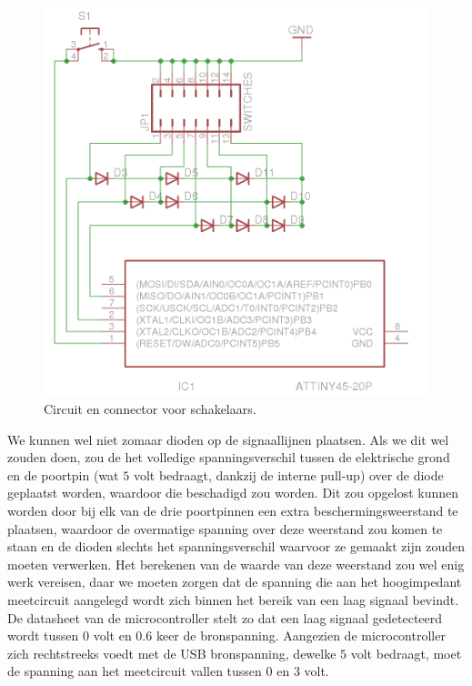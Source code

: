 \begin{figure}
	\includegraphics[width=\textwidth]{afbeeldingen/inputmodule_schakelaars}
	\caption{Circuit en connector voor schakelaars.}
\end{figure}

We kunnen wel niet zomaar dioden op de signaallijnen plaatsen. Als we dit wel zouden doen, zou de het volledige spanningsverschil tussen de elektrische grond en de poortpin (wat $5$ volt bedraagt, dankzij de interne pull-up) over de diode geplaatst worden, waardoor die beschadigd zou worden. Dit zou opgelost kunnen worden door bij elk van de drie poortpinnen een extra beschermingsweerstand te plaatsen, waardoor de overmatige spanning over deze weerstand zou komen te staan en de dioden slechts het spanningsverschil waarvoor ze gemaakt zijn zouden moeten verwerken. Het berekenen van de waarde van deze weerstand zou wel enig werk vereisen, daar we moeten zorgen dat de spanning die aan het hoogimpedant meetcircuit aangelegd wordt zich binnen het bereik van een laag signaal bevindt. De datasheet van de microcontroller stelt zo dat een laag signaal gedetecteerd wordt tussen $0$ volt en $0.6$ keer de bronspanning. Aangezien de microcontroller zich rechtstreeks voedt met de USB bronspanning, dewelke $5$ volt bedraagt, moet de spanning aan het meetcircuit vallen tussen $0$ en $3$ volt.

